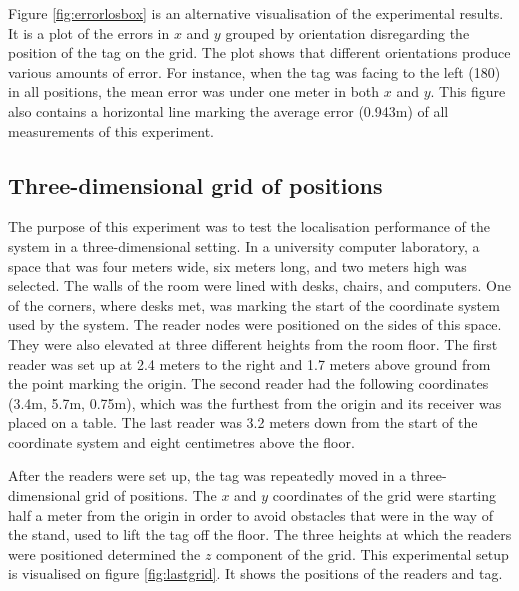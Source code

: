 Figure \ref{fig:errorlosbox} is an alternative visualisation of the experimental results. It is a plot of the errors in $x$ and $y$ grouped by orientation disregarding the position of the tag on the grid. The plot shows that different orientations produce various amounts of error. For instance, when the tag was facing to the left (180\textdegree) in all positions, the mean error was under one meter in both $x$ and $y$. This figure also contains a horizontal line marking the average error (0.943m) of all measurements of this experiment.


\subsection{Three-dimensional grid of positions}
\label{sec:3d}

The purpose of this experiment was to test the localisation performance of the system in a three-dimensional setting. In a university computer laboratory, a space that was four meters wide, six meters long, and two meters high was selected. The walls of the room were lined with desks, chairs, and computers. One of the corners, where desks met, was marking the start of the coordinate system used by the system. The reader nodes were positioned on the sides of this space. They were also elevated at three different heights from the room floor. The first reader was set up at 2.4 meters to the right and 1.7 meters above ground from the point marking the origin. The second reader had the following coordinates (3.4m, 5.7m, 0.75m), which was the furthest from the origin and its receiver was placed on a table. The last reader was 3.2 meters down from the start of the coordinate system and eight centimetres above the floor.

After the readers were set up, the tag was repeatedly moved in a three-dimensional grid of positions. The $x$ and $y$ coordinates of the grid were starting half a meter from the origin in order to avoid obstacles that were in the way of the stand, used to lift the tag off the floor. The three heights at which the readers were positioned determined the $z$ component of the grid. This experimental setup is visualised on figure \ref{fig:lastgrid}. It shows the positions of the readers and tag.

